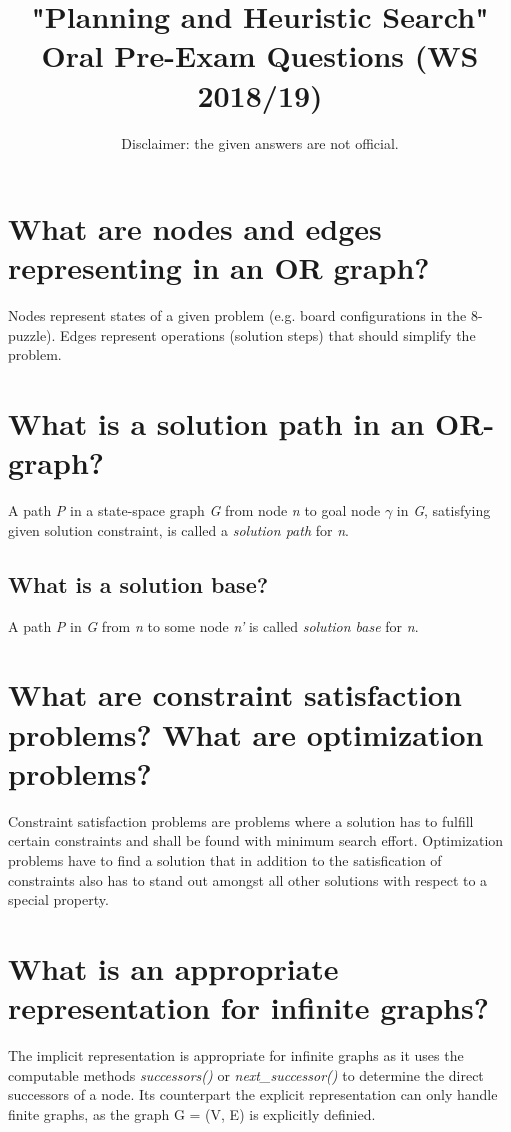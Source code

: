 \documentclass[12pt, a4paper]{article}
\begin{document}
\title{"Planning and Heuristic Search" \\ Oral Pre-Exam Questions (WS 2018/19)}
\author{Disclaimer: the given answers are not official.}
\date{}
\maketitle
%
\section{What are nodes and edges representing in an OR graph?}
Nodes represent states of a given problem (e.g. board configurations in the 8-puzzle). Edges represent operations (solution steps) that should simplify the problem.


\section{What is a solution path in an OR-graph?}
A path \textit{P} in a state-space graph \textit{G} from node \textit{n} to goal node $\gamma$ in \textit{G}, satisfying given solution constraint,  is called a \textit{solution path} for \textit{n}. 
\subsection*{What is a solution base?}
A path \textit{P} in \textit{G} from \textit{n} to some node \textit{n'} is called \textit{solution base} for \textit{n}.


\section{What are constraint satisfaction problems? What are optimization problems?}
Constraint satisfaction problems are problems where a solution has to fulfill certain constraints and shall be found with minimum search effort. Optimization problems have to find a solution that in addition to the satisfication of constraints also has to stand out amongst all other solutions with respect to a special property.


\section{What is an appropriate representation for infinite graphs?}
The implicit representation is appropriate for infinite graphs as it uses the computable methods \textit{successors()} or \textit{next\_successor()} to determine the direct successors of a node. Its counterpart the explicit representation can only handle finite graphs, as the graph G = (V, E) is explicitly definied.
\end{document}

